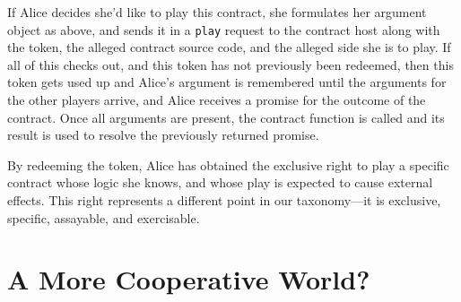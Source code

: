 \documentclass{llncs}
\begin{document}
If Alice decides she'd like to play this contract, she formulates her argument object as above, and sends it in a {\tt play} request to the contract host along with the token, the alleged contract source code, and the alleged side she is to play. If all of this checks out, and this token has not previously been redeemed, then this token gets used up and Alice's argument is remembered until the arguments for the other players arrive, and Alice receives a promise for the outcome of the contract. Once all arguments are present, the contract function is called and its result is used to resolve the previously returned promise.

By redeeming the token, Alice has obtained the exclusive right to play a specific contract whose logic she knows, and whose play is expected to cause external effects. This right represents a different point in our taxonomy---it is exclusive, specific, assayable, and exercisable. 



\section{A More Cooperative World?}


% 

\end{document}
